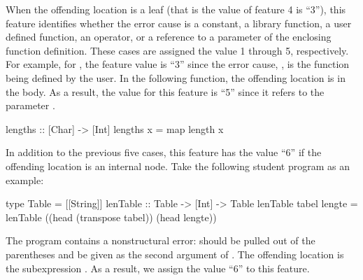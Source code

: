 \documentclass[12pt]{report}	%
\begin{document}
When the offending location is a leaf (that is the value of
feature 4 is ``3''), this feature identifies whether the
error cause is a constant, a library function,
a user defined function, an operator, 
or a reference to a parameter of the enclosing
function definition. These
cases are assigned the value 1 through 5, respectively.
%
For example,
for , 
the feature value is ``3''
since the error cause, , is the
function being defined by the user. 
%
In the following function, the offending location 
is  in the body. As a result, the 
value for this feature is ``5'' since it refers
to the parameter .
%
\begin{program}
lengths :: [Char] -> [Int]
lengths x = map length x
\end{program}
%
In addition to the previous five cases, 
this feature has the value ``6'' if the offending
location is an internal node.
%
Take the following student program as an example:
%
\begin{program}
type Table = [[String]]
lenTable :: Table -> [Int] -> Table
lenTable tabel lengte = lenTable ((head (transpose tabel)) (head lengte))
\end{program}
%
The program contains a nonstructural error: 
 should be pulled
out of the parentheses and be given as the second
argument of .
%
The offending location is the
subexpression . As a result,
we assign the value ``6'' to this feature. 
\end{document}
